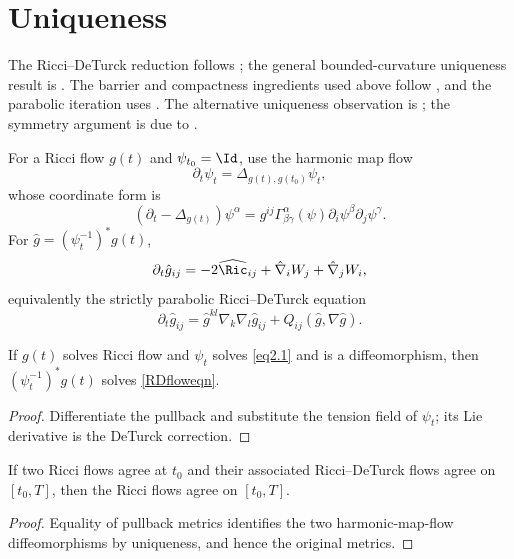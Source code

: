 \section{Uniqueness}\label{12.4}
The Ricci--DeTurck reduction follows \cite{DeTurck}\cite{LuTian}; the general
bounded-curvature uniqueness result is \cite{ChenZhu}. The barrier and
compactness ingredients used above follow \cite{Hamiltonlimits}\cite{Shi1},
and the parabolic iteration uses \cite{LiTam}\cite{LiTam}\cite{LSU}\cite{LSU}.
The alternative uniqueness observation is \cite{ChenZhu}; the symmetry
argument is due to \cite{ChowKnopf}.

For a Ricci flow $g(t)$ and $\psi_{t_0}=\Id$, use the harmonic map flow
\begin{equation}\label{eq2.1}\partial_t\psi_t=\Delta_{g(t),g(t_0)}\psi_t,\end{equation}
whose coordinate form is
\begin{equation}\label{eq2.2}
(\partial_t-\Delta_{g(t)})\psi^\alpha=g^{ij}\Gamma^\alpha_{\beta\gamma}(\psi)\partial_i\psi^\beta\partial_j\psi^\gamma.
\end{equation}
For $\hat g=(\psi_t^{-1})^*g(t)$,
\begin{equation}\label{RDfloweqn}
\partial_t\hat g_{ij}=-2\widehat{\Ric}_{ij}+\hat\nabla_iW_j+\hat\nabla_jW_i,
\end{equation}
equivalently the strictly parabolic Ricci--DeTurck equation
\begin{equation}\label{eqRcDeTurck}
\partial_t\hat g_{ij}=\hat g^{kl}\nabla_k\nabla_l\hat g_{ij}+Q_{ij}(\hat g,\nabla\hat g).
\end{equation}

\begin{lemma}
\label{lem:harmonic-map-flow-ricci-deturck}
\label{12.7}
If $g(t)$ solves Ricci flow and $\psi_t$ solves \eqref{eq2.1} and is a
diffeomorphism, then $(\psi_t^{-1})^*g(t)$ solves \eqref{RDfloweqn}.
\end{lemma}
\begin{proof}
\sketch Differentiate the pullback and substitute the tension field of
$\psi_t$; its Lie derivative is the DeTurck correction.
\end{proof}

\begin{corollary}
\label{cor:ricci-deturck-uniqueness-implies-ricci-uniqueness}
\label{dtuniqtouniq}
If two Ricci flows agree at $t_0$ and their associated Ricci--DeTurck
flows agree on $[t_0,T]$, then the Ricci flows agree on $[t_0,T]$.
\end{corollary}
\begin{proof}
\sketch Equality of pullback metrics identifies the two harmonic-map-flow
diffeomorphisms by uniqueness, and hence the original metrics.
\end{proof}

